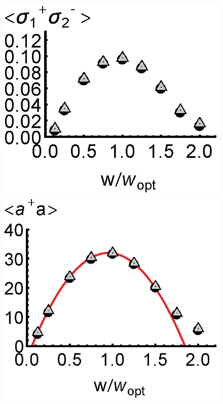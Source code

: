 \documentclass[aps,
twocolumn,
showpacs,
superscriptaddress,groupedaddress]{revtex4}
\begin{document}
\begin{figure}
\begin{center}
	\hspace{-5.0mm} \includegraphics[scale =0.38] {N40CrossoverSPSM.eps}
	\hspace{-5.0mm} \includegraphics[scale =0.38] {N40Crossoverada.eps}

\end{center}
\end{figure}
\end{document}
